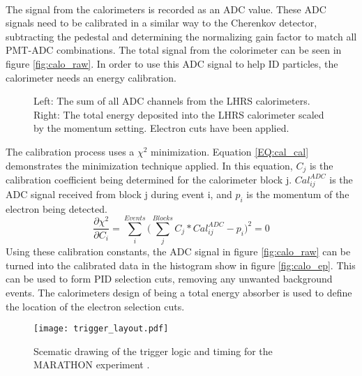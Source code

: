 	\paragraph{} The signal from the calorimeters is recorded as an ADC value. These ADC signals need to be calibrated in a similar way to the Cherenkov detector, subtracting the pedestal and determining the normalizing gain factor to match all PMT-ADC combinations. The total signal from the colorimeter can be seen in figure \ref{fig:calo_raw}. In order to use this ADC signal to help ID particles, the calorimeter needs an energy calibration. 
	\begin{figure}[t]
		\centering
		\centering	
		\caption{Left: The sum of all ADC channels from the LHRS calorimeters. Right: The total energy deposited into the LHRS calorimeter scaled by the momentum setting. Electron cuts have been applied.}
	\end{figure}
	The calibration process uses a $\chi^2$ minimization. Equation \ref{EQ:cal_cal} demonstrates the minimization technique applied. In this equation, $C_j$ is the calibration coefficient being determined for the calorimeter block j. $Cal^{ADC}_{ij}$ is the ADC signal received from block j during event i, and $p_i$ is the momentum of the electron being detected. 
	\begin{equation}
		\frac{\partial\chi^2}{\partial C_i} = \sum\limits_{i}^{Events} \bigg( \sum\limits_{j}^{Blocks}C_{j}*Cal^{ADC}_{ij} - p_i  \bigg)^2 = 0 
		\label{EQ:cal_cal}
	\end{equation}
	Using these calibration constants, the ADC signal in figure \ref{fig:calo_raw} can be turned into the calibrated data in the histogram show in figure \ref{fig:calo_ep}. This can be used to form PID selection cuts, removing any unwanted background events. The calorimeters design of being a total energy absorber is used to define the location of the electron selection cuts.  
	
\begin{figure}[t]
	\centering
	\texttt{[image: trigger\_layout.pdf]}
	\caption{Scematic drawing of the trigger logic and timing for the MARATHON experiment \cite{flo_trig}.}
	\label{fig:trig_layout}
\end{figure}	
	
